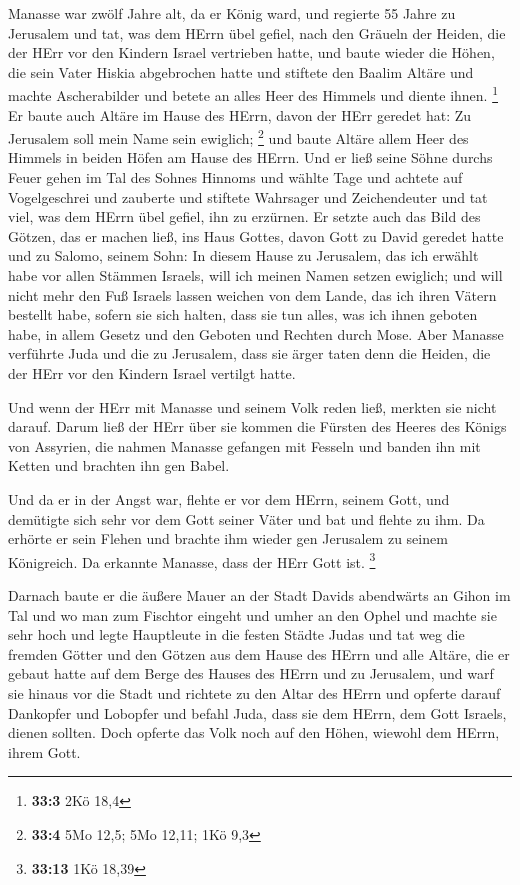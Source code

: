 Manasse war zwölf Jahre alt, da er König ward, und regierte
55 Jahre zu Jerusalem  und tat, was dem HErrn übel gefiel,
nach den Gräueln der Heiden, die der HErr vor den Kindern Israel
vertrieben hatte,  und baute wieder die Höhen, die sein
Vater Hiskia abgebrochen hatte und stiftete den Baalim Altäre und machte
Ascherabilder und betete an alles Heer des Himmels und diente ihnen.
\footnote{\textbf{33:3} 2Kö 18,4}  Er baute auch Altäre im
Hause des HErrn, davon der HErr geredet hat: Zu Jerusalem soll mein Name
sein ewiglich; \footnote{\textbf{33:4} 5Mo 12,5; 5Mo 12,11; 1Kö 9,3}
 und baute Altäre allem Heer des Himmels in beiden Höfen am
Hause des HErrn.  Und er ließ seine Söhne durchs Feuer gehen
im Tal des Sohnes Hinnoms und wählte Tage und achtete auf Vogelgeschrei
und zauberte und stiftete Wahrsager und Zeichendeuter und tat viel, was
dem HErrn übel gefiel, ihn zu erzürnen.  Er setzte auch das
Bild des Götzen, das er machen ließ, ins Haus Gottes, davon Gott zu
David geredet hatte und zu Salomo, seinem Sohn: In diesem Hause zu
Jerusalem, das ich erwählt habe vor allen Stämmen Israels, will ich
meinen Namen setzen ewiglich;  und will nicht mehr den Fuß
Israels lassen weichen von dem Lande, das ich ihren Vätern bestellt
habe, sofern sie sich halten, dass sie tun alles, was ich ihnen geboten
habe, in allem Gesetz und den Geboten und Rechten durch Mose.
 Aber Manasse verführte Juda und die zu Jerusalem, dass sie
ärger taten denn die Heiden, die der HErr vor den Kindern Israel
vertilgt hatte.

 Und wenn der HErr mit Manasse und seinem Volk reden ließ,
merkten sie nicht darauf.  Darum ließ der HErr über sie
kommen die Fürsten des Heeres des Königs von Assyrien, die nahmen
Manasse gefangen mit Fesseln und banden ihn mit Ketten und brachten ihn
gen Babel.

 Und da er in der Angst war, flehte er vor dem HErrn,
seinem Gott, und demütigte sich sehr vor dem Gott seiner Väter
 und bat und flehte zu ihm. Da erhörte er sein Flehen und
brachte ihm wieder gen Jerusalem zu seinem Königreich. Da erkannte
Manasse, dass der HErr Gott ist. \footnote{\textbf{33:13} 1Kö 18,39}

 Darnach baute er die äußere Mauer an der Stadt Davids
abendwärts an Gihon im Tal und wo man zum Fischtor eingeht und umher an
den Ophel und machte sie sehr hoch und legte Hauptleute in die festen
Städte Judas  und tat weg die fremden Götter und den Götzen
aus dem Hause des HErrn und alle Altäre, die er gebaut hatte auf dem
Berge des Hauses des HErrn und zu Jerusalem, und warf sie hinaus vor die
Stadt  und richtete zu den Altar des HErrn und opferte
darauf Dankopfer und Lobopfer und befahl Juda, dass sie dem HErrn, dem
Gott Israels, dienen sollten.  Doch opferte das Volk noch
auf den Höhen, wiewohl dem HErrn, ihrem Gott.

